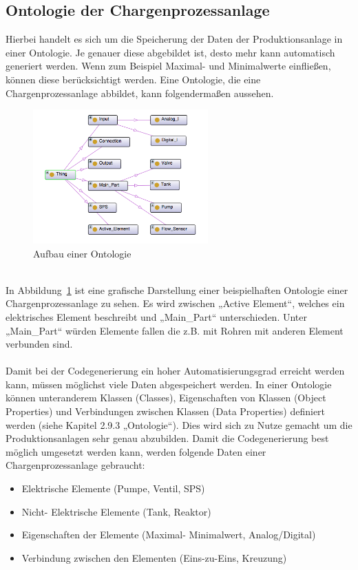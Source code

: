 \subsection{Ontologie der Chargenprozessanlage}
Hierbei handelt es sich um die Speicherung der Daten der Produktionsanlage in einer Ontologie. Je genauer diese abgebildet ist, desto mehr kann automatisch generiert werden. Wenn zum Beispiel Maximal- und Minimalwerte einfließen, können diese berücksichtigt werden.
Eine Ontologie, die eine Chargenprozessanlage abbildet, kann folgendermaßen aussehen. 
\begin{figure}[hbt!]
 \centering
  \includegraphics[width=0.6\textwidth]{graphics/stateoftheart/Ontology_Aufbau}
  \caption{Aufbau einer Ontologie}
  \label{fig:konz_Aufbau_Ontologie}
\end{figure}\\
In Abbildung~\ref{fig:konz_Aufbau_Ontologie} ist eine grafische Darstellung einer beispielhaften Ontologie einer Chargenprozessanlage zu sehen. Es wird zwischen „Active Element“, welches ein elektrisches Element beschreibt und „Main\_Part“ unterschieden. Unter „Main\_Part“ würden Elemente fallen die z.B. mit Rohren mit anderen Element verbunden sind.
\\\\
Damit bei der Codegenerierung ein hoher Automatisierungsgrad  erreicht werden kann, müssen möglichst viele Daten abgespeichert werden. In einer Ontologie können unteranderem Klassen (Classes), Eigenschaften von Klassen (Object Properties) und Verbindungen zwischen Klassen (Data Properties) definiert werden (siehe Kapitel 2.9.3 „Ontologie“). Dies wird sich zu Nutze gemacht um die Produktionsanlagen sehr genau abzubilden. Damit die Codegenerierung best möglich umgesetzt werden kann, werden folgende Daten einer Chargenprozessanlage gebraucht:

\begin{itemize}
  \item Elektrische Elemente (Pumpe, Ventil, \ac{SPS})
  \item Nicht- Elektrische Elemente (Tank, Reaktor)
  \item Eigenschaften der Elemente (Maximal- Minimalwert, Analog/Digital)
  \item Verbindung zwischen den Elementen (Eins-zu-Eins, Kreuzung)
\end{itemize}

